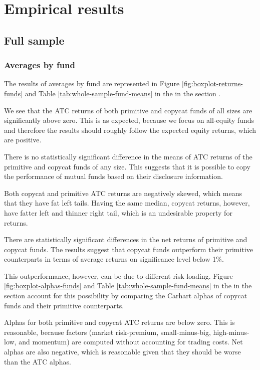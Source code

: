 \documentclass[12pt, a4]{article}
\begin{document}
\clearpage
\section{Empirical results}\label{sec:results}

\subsection{Full sample}

\subsubsection{Averages by fund}

The results of averages by fund are represented in Figure \ref{fig:boxplot-returns-funds} and Table \ref{tab:whole-sample-fund-means} in the  in the section . 

We see that the \textsc{ATC} returns of both primitive and copycat funds of all sizes are significantly above zero. This is as expected, because we focus on all-equity funds and therefore the results should roughly follow the expected equity returns, which are positive. 

There is no statistically significant difference in the means of \textsc{ATC} returns of the primitive and copycat funds of any size. This suggests that it is possible to copy the performance of mutual funds based on their disclosure information.

Both copycat and primitive \textsc{ATC} returns are negatively skewed, which means that they have fat left tails. Having the same median, copycat returns, however, have fatter left and thinner right tail, which is an undesirable property for returns.

There are statistically significant differences in the net returns of primitive and copycat funds. The results suggest that copycat funds outperform their primitive counterparts in terms of average returns on significance level below 1\%.

This outperformance, however, can be due to different risk loading. Figure \ref{fig:boxplot-alphas-funds} and Table \ref{tab:whole-sample-fund-means} in the  in the section  account for this possibility by comparing the Carhart alphas of copycat funds and their primitive counterparts. 

Alphas for both primitive and copycat \textsc{ATC} returns are below zero. This is reasonable, because factors (market risk-premium, small-minus-big, high-minus-low, and momentum) are computed without accounting for trading costs. Net alphas are also negative, which is reasonable given that they should be worse than the \textsc{ATC} alphas.
\end{document}
